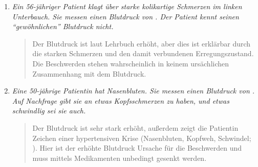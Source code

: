 {\begin{enumerate}
\begin{quote}
Der Blutdruck ist für den Patienten zu niedrig, der Körper
ist auf eine so plötzliche Umstellung nicht vorbereitet
gewesen. Durch das Anamnesegespräch erfahren sie, dass er
heute das erste Mal einen \enquote{Nitro-Spray} verwendet hat. Sie
vermerken dies am Einsatzprotokoll. Im Krankenhaus erfahren
Sie, dass wahrscheinlich eine Überdosierung dieses
Medikaments die Ursache dieses Blutdruckabfalls war.
${\rightarrow}$ Obwohl der Patient laut Lehrbuch einen
\enquote{schönen} Blutdruck hatte, war dieser dennoch zu niedrig!
\end{quote}

\item \emph{Ein 56-jähriger Patient klagt über starke kolikartige
Schmerzen im linken Unterbauch. Sie messen einen Blutdruck
von . Der Patient kennt seinen
\enquote{gewöhnlichen} Blutdruck
nicht.}  

\begin{quote}
Der Blutdruck ist laut Lehrbuch erhöht, aber dies ist
erklärbar durch die starken Schmerzen und den damit
verbundenen Erregungszustand. Die Beschwerden stehen
wahrscheinlich in
keinem ursächlichen Zusammenhang mit dem Blutdruck.
\end{quote}

\item \emph{Eine 50-jährige Patientin hat Nasenbluten. Sie
messen einen Blutdruck von . Auf Nachfrage gibt sie an
etwas Kopfsschmerzen zu haben, und etwas schwindlig sei sie auch.} 


\begin{quote}
Der Blutdruck ist sehr stark erhöht, außerdem zeigt die
Patientin Zeichen einer hypertensiven Krise (Nasenbluten,
Kopfweh, Schwindel;
).
Hier ist der erhöhte Blutdruck Ursache für die Beschwerden
und muss mittels Medikamenten unbedingt gesenkt werden.
\end{quote}

\end{enumerate}
}
